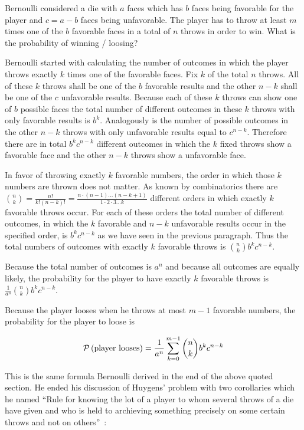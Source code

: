 Bernoulli considered a die with $a$ faces which has $b$ faces being favorable for the player and $c=a-b$ faces being unfavorable. The player has to throw at least $m$ times one of the $b$ favorable faces in a total of $n$ throws in order to win. What is the probability of winning / loosing?

Bernoulli started with calculating the number of outcomes in which the player throws exactly $k$ times one of the favorable faces. Fix $k$ of the total $n$ throws. All of these $k$ throws shall be one of the $b$ favorable results and the other $n-k$ shall be one of the $c$ unfavorable results. Because each of these $k$ throws can show one of $b$ possible faces the total number of different outcomes in these $k$ throws with only favorable results is $b^k$. Analogously is the number of possible outcomes in the other $n-k$ throws with only unfavorable results equal to $c^{n-k}$. Therefore there are in total $b^kc^{n-k}$ different outcomes in which the $k$ fixed throws show a favorable face and the other $n-k$ throws show a unfavorable face.

In favor of throwing exactly $k$ favorable numbers, the order in which those $k$ numbers are thrown does not matter. As known by combinatorics there are $\binom nk=\frac{n!}{k!(n-k)!}=\frac{n\cdot(n-1)\ldots(n-k+1)}{1\cdot2\cdot3\ldots k}$ different orders in which exactly $k$ favorable throws occur. For each of these orders the total number of different outcomes, in which the $k$ favorable and $n-k$ unfavorable results occur in the specified order, is $b^kc^{n-k}$ as we have seen in the previous paragraph. Thus the total numbers of outcomes with exactly $k$ favorable throws is $\binom nk b^k c^{n-k}$.

Because the total number of outcomes is $a^n$ and because all outcomes are equally likely, the probability for the player to have exactly $k$ favorable throws is $\frac {1}{a^n} \binom nk b^k c^{n-k}$.

Because the player looses when he throws at most $m-1$ favorable numbers, the probability for the player to loose is

\begin{align}
  \P{\text{player looses}} = \frac{1}{a^n} \sum_{k=0}^{m-1} \binom nk b^k c^{n-k}
\end{align}

This is the same formula Bernoulli derived in the end of the above quoted section. He ended his discussion of Huygens' problem with two corollaries which he named ``Rule for knowing the lot of a player to whom several throws of a die have given and who is held to archieving something precisely on some certain throws and not on others''~\cite[p. 170]{bernoulli}:

